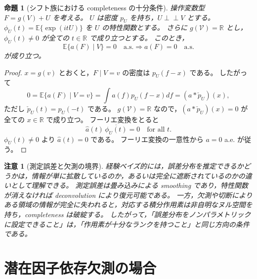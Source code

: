 \documentclass[dvipdfmx,autodetect-engine]{jsarticle}
\newtheorem{proposition}{命題}
\newtheorem{remark}{注意}
\newcommand{\indep}{\mathrel{\perp\!\!\!\perp}}
\newcommand{\E}{\mathbb{E}}
\newcommand{\R}{\mathbb{R}}
\newcommand{\1}{\mathbf{1}}
\newcommand{\calV}{\mathcal{V}}
\begin{document}
\begin{proposition}[シフト族における completeness の十分条件]
\label{prop:fourier-completeness}
操作変数型 $F=g(V)+U$ を考える。
$U$ は密度 $p_U$ を持ち，$U\indep V$ とする。
$\phi_U(t)=\E\{\exp(itU)\}$ を $U$ の特性関数とする。
さらに $g(\calV)=\R$ とし，$\phi_U(t)\neq0$ が全ての $t\in\R$ で成り立つとする。
このとき，
\begin{equation}
  \E\{a(F)\mid V\}=0 \quad \text{a.s.}
  \Longrightarrow
  a(F)=0 \quad \text{a.s.}
  \label{eq:fourier-completeness}
\end{equation}
が成り立つ。
\end{proposition}

\begin{proof}
$x=g(v)$ とおくと，$F\mid V=v$ の密度は $p_U(f-x)$ である。
したがって
\begin{equation}
  0=\E\{a(F)\mid V=v\}
  =\int a(f)p_U(f-x)df
  = (a*\check p_U)(x),
  \label{eq:convolution-completeness}
\end{equation}
ただし $\check p_U(t)=p_U(-t)$ である。
$g(\calV)=\R$ なので，$(a*\check p_U)(x)=0$ が全ての $x\in\R$ で成り立つ。
フーリエ変換をとると
\begin{equation}
  \widehat a(t)\,\overline{\phi_U(t)}=0
  \quad \text{for all }t.
\end{equation}
$\phi_U(t)\neq0$ より $\widehat a(t)=0$ である。
フーリエ変換の一意性から $a=0$ a.e. が従う。
\end{proof}

\begin{remark}[測定誤差と欠測の境界]
経験ベイズ的には，誤差分布を推定できるかどうかは，情報が単に拡散しているのか，あるいは完全に遮断されているのかの違いとして理解できる。
測定誤差は畳み込みによる smoothing であり，特性関数が消えなければ deconvolution により復元可能である。
一方，欠測や切断によりある領域の情報が完全に失われると，対応する積分作用素は非自明なヌル空間を持ち，completeness は破綻する。
したがって，「誤差分布をノンパラメトリックに設定できること」は，「作用素が十分なランクを持つこと」と同じ方向の条件である。
\end{remark}

\section{潜在因子依存欠測の場合}
\end{document}
